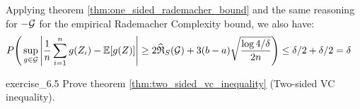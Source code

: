\begin{solution*}
    \noindent Applying theorem \ref{thm:one_sided_rademacher_bound} and the same reasoning for $-\mathcal{G}$ for the empirical Rademacher Complexity bound, we also have:
    \begin{align*}
        P\Bigg( 
            \sup_{g\in\mathcal{G}}\Bigg| 
                \frac{1}{n}\sum_{i=1}^n g(Z_i) - \mathbb{E}[g(Z)]
             \Bigg| \ge 2\widehat{\mathfrak{R}}_S(\mathcal{G}) + 3(b-a)\sqrt{\frac{\log 4/\delta}{2n}}
         \Bigg)&\le \delta/2 + \delta/2 = \delta
    \end{align*}
\end{solution*}

\begin{exercise}{}{exercise_6.5}
    Prove theorem \ref{thm:two_sided_vc_inequality} (Two-sided VC inequality).
\end{exercise}

\begin{solution*}
    
\end{solution*}
